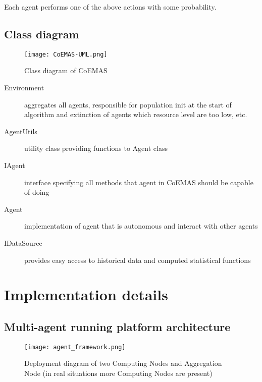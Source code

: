 Each agent performs one of the above actions with some probability.



\subsection{Class diagram}
\label{CoEMAS-class-diagram}

\begin{figure}[ht]   
	    \begin{center}
	      \texttt{[image: CoEMAS-UML.png]}
	    \end{center}
	    \caption{Class diagram of CoEMAS} 
	  \end{figure}

\begin{description}
  \item [Environment]
      aggregates all agents, responsible for population init at the start of algorithm and extinction of agents which resource level are too low, etc.
  \item [AgentUtils]
      utility class providing functions to Agent class
  \item [IAgent]
      interface specifying all methods that agent in CoEMAS should be capable of doing
  \item [Agent]
      implementation of agent that is autonomous and interact with other agents
  \item [IDataSource]
      provides easy access to historical data and computed statistical functions
 
\end{description}



\section{Implementation details}
\label{sec:implDetails}


\subsection{Multi-agent running platform architecture}
\label{multi-agent}

\begin{figure}[ht]
  \begin{center}
    \texttt{[image: agent\_framework.png]}
  \end{center}
  \caption{Deployment diagram of two Computing Nodes and Aggregation Node (in real situations more Computing Nodes are present)}
\end{figure}

